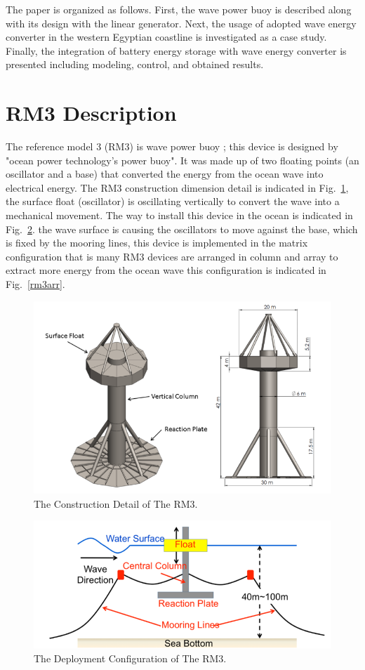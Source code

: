 \documentclass[conference]{IEEEtran}
\begin{document}
The paper is organized as follows. First, the wave power buoy is described along with its design with the linear generator. Next, the usage of adopted wave energy converter in the western Egyptian coastline is investigated as a case study. Finally, the integration of battery energy storage with wave energy converter is presented including modeling, control, and obtained results.

\section{RM3 Description}
The reference model 3 (RM3) is wave power buoy \cite{neary2014methodology}; this device is designed by "ocean power technology's power buoy". It was made up of two floating points (an oscillator and a base) that converted the energy from the ocean wave into electrical energy. The RM3 construction dimension detail is indicated in Fig.~\ref{rm3c}, the surface float (oscillator) is oscillating vertically to convert the wave into a mechanical movement. The way to install this device in the ocean is indicated in Fig.~\ref{rm3dep}. the wave surface is causing the oscillators to move against the base, which is fixed by the mooring lines, this device is implemented in the matrix configuration that is many RM3 devices are arranged in column and array to extract more energy from the ocean wave this configuration is indicated in Fig.~\ref{rm3arr}.

\begin{figure}[htbp]
	\centerline{\includegraphics[width=2.5 in]{fig/1.png}}
	\caption{The Construction Detail of The RM3\cite{lawson2014development}.}
	\label{rm3c}
\end{figure}
\begin{figure}[htbp]
	\centerline{\includegraphics[width=2.9 in]{fig/2.png}}
	\caption{The Deployment Configuration of The RM3\cite{neary2014methodology}.}
	\label{rm3dep}
\end{figure}
\end{document}

